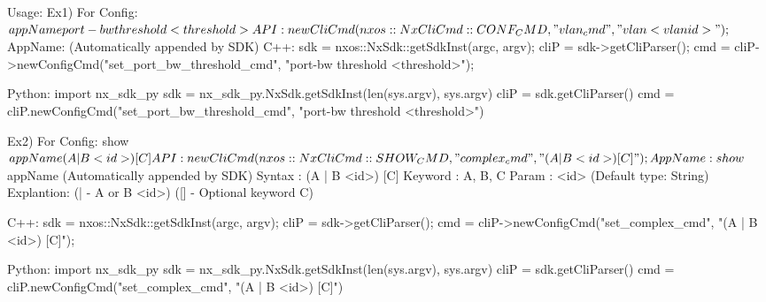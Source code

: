 \begin{DoxyCode}
  Usage:                             
       Ex1) For Config: $appName port-bw threshold <threshold>
             API:  newCliCmd(nxos::NxCliCmd::CONF_CMD, "vlan_cmd", "vlan <vlanid>
      ");
             $AppName: (Automatically appended by SDK)
  C++:
       sdk = nxos::NxSdk::getSdkInst(argc, argv);
       cliP = sdk->getCliParser();
       cmd = cliP->newConfigCmd("set_port_bw_threshold_cmd",
                                    "port-bw threshold <threshold>");

  Python:
       import nx_sdk_py
       sdk = nx_sdk_py.NxSdk.getSdkInst(len(sys.argv), sys.argv)
       cliP = sdk.getCliParser()
       cmd = cliP.newConfigCmd("set_port_bw_threshold_cmd", 
                               "port-bw threshold <threshold>")
\end{DoxyCode}



\begin{DoxyCode}
       Ex2) For Config: show $appName (A | B <id>) [C] 
             API:  newCliCmd(nxos::NxCliCmd::SHOW_CMD, "complex_cmd", "(A | B <id
      >) [C]");
             App Name: show $appName (Automatically appended by SDK)
             Syntax  : (A | B <id>) [C]
                 Keyword   : A, B, C
                 Param     : <id> (Default type: String)
                 Explantion: (| - A or B <id>) 
                             ([] - Optional keyword C)
 
  C++:
       sdk = nxos::NxSdk::getSdkInst(argc, argv);
       cliP = sdk->getCliParser();
       cmd = cliP->newConfigCmd("set_complex_cmd",
                                "(A | B <id>) [C]");

  Python:
       import nx_sdk_py
       sdk = nx_sdk_py.NxSdk.getSdkInst(len(sys.argv), sys.argv)
       cliP = sdk.getCliParser()
       cmd = cliP.newConfigCmd("set_complex_cmd", "(A | B <id>) [C]") 
\end{DoxyCode}


